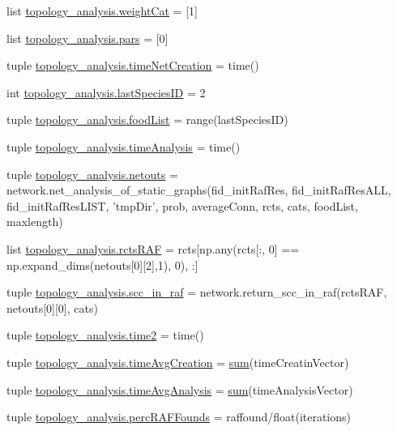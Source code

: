 \begin{DoxyCompactItemize}
\item 
list \hyperlink{a00157_a67cf979bfd8cf26867524a1a788a5e63}{topology\-\_\-analysis.\-weight\-Cat} = \mbox{[}1\mbox{]}
\item 
list \hyperlink{a00157_a516f339905d01b02a4e16181f2fde4be}{topology\-\_\-analysis.\-pars} = \mbox{[}0\mbox{]}
\item 
tuple \hyperlink{a00157_a2f85d448268dd44ad47f66b65bfa45b6}{topology\-\_\-analysis.\-time\-Net\-Creation} = time()
\item 
int \hyperlink{a00157_a1aa5d59ebf308accb3c960b5fd90a445}{topology\-\_\-analysis.\-last\-Species\-I\-D} = 2
\item 
tuple \hyperlink{a00157_a96850fa3d62df1176a8d7a5b988f4a32}{topology\-\_\-analysis.\-food\-List} = range(last\-Species\-I\-D)
\item 
tuple \hyperlink{a00157_ace5bda70ff24e6a220afb4438240003a}{topology\-\_\-analysis.\-time\-Analysis} = time()
\item 
tuple \hyperlink{a00157_af42f57da8ba80463f419efaf0f6f2c33}{topology\-\_\-analysis.\-netouts} = network.\-net\-\_\-analysis\-\_\-of\-\_\-static\-\_\-graphs(fid\-\_\-init\-Raf\-Res, fid\-\_\-init\-Raf\-Res\-A\-L\-L, fid\-\_\-init\-Raf\-Res\-L\-I\-S\-T, 'tmp\-Dir', prob, average\-Conn, rcts, cats, food\-List, maxlength)
\item 
list \hyperlink{a00157_aeb909c76682b690cc5ab6aca5ac37c4d}{topology\-\_\-analysis.\-rcts\-R\-A\-F} = rcts\mbox{[}np.\-any(rcts\mbox{[}\-:, 0\mbox{]} == np.\-expand\-\_\-dims(netouts\mbox{[}0\mbox{]}\mbox{[}2\mbox{]},1), 0), \-:\mbox{]}
\item 
tuple \hyperlink{a00157_ac864e2a75b705766c1d81f68897f52c0}{topology\-\_\-analysis.\-scc\-\_\-in\-\_\-raf} = network.\-return\-\_\-scc\-\_\-in\-\_\-raf(rcts\-R\-A\-F, netouts\mbox{[}0\mbox{]}\mbox{[}0\mbox{]}, cats)
\item 
tuple \hyperlink{a00157_a44666efa43bfc08ab8305c8d325f7456}{topology\-\_\-analysis.\-time2} = time()
\item 
tuple \hyperlink{a00157_a4cd61f10a5a0a8d80608e71a1fc2009c}{topology\-\_\-analysis.\-time\-Avg\-Creation} = \hyperlink{a00106_a59a869fb2b28d56dacd91c09e1dffc8d}{sum}(time\-Creatin\-Vector)
\item 
tuple \hyperlink{a00157_a0689e49982e7bedba8ac4eb5534963db}{topology\-\_\-analysis.\-time\-Avg\-Analysis} = \hyperlink{a00106_a59a869fb2b28d56dacd91c09e1dffc8d}{sum}(time\-Analysis\-Vector)
\item 
tuple \hyperlink{a00157_a51a66ce80f70aeab8bde70af9960e419}{topology\-\_\-analysis.\-perc\-R\-A\-F\-Founds} = raffound/float(iterations)

\end{DoxyCompactItemize}
